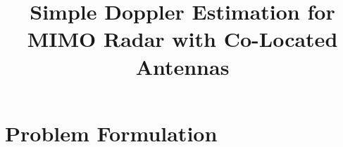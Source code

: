 \documentclass[journal,draftcls,onecolumn,twoside]{IEEEtran}
\begin{document}
%
\title{Simple Doppler Estimation for MIMO Radar with Co-Located Antennas}



\maketitle


%
%
%
%
%
\section{Problem Formulation}
\label{sec:Problem Fromulation}
\end{document}
